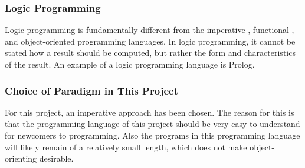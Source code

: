 \subsubsection{Logic Programming}
Logic programming is fundamentally different from the imperative-, functional-, and object-oriented programming languages. In logic programming, it cannot be stated how a result should be computed, but rather the form and characteristics of the result. An example of a logic programming language is Prolog.

\subsubsection{Choice of Paradigm in This Project}
For this project, an imperative approach has been chosen. The reason for this is that the programming language of this project should be very easy to understand for newcomers to programming. Also the programs in this programming language will likely remain of a relatively small length, which does not make object-orienting desirable.